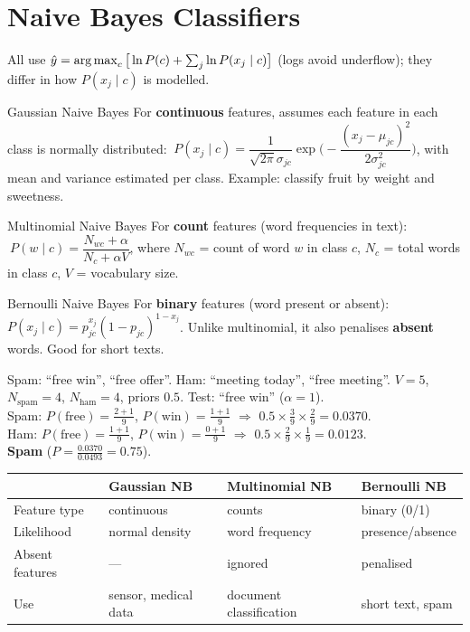 \section{Naive Bayes Classifiers}
All use $\hat y=\operatorname*{arg\,max}_c\big[\ln P(c)+\sum_j\ln P(x_j\mid c)\big]$ (logs avoid underflow); they differ in how $P(x_j\mid c)$ is modelled.

\begin{dfn}{Gaussian Naive Bayes}
For \textbf{continuous} features, assumes each feature in each class is normally distributed:
$\ P(x_j\mid c)=\dfrac1{\sqrt{2\pi}\sigma_{jc}}\exp\!\Big(-\dfrac{(x_j-\mu_{jc})^2}{2\sigma_{jc}^2}\Big)$, with mean and variance estimated per class. Example: classify fruit by weight and sweetness.
\end{dfn}
\begin{dfn}{Multinomial Naive Bayes}
For \textbf{count} features (word frequencies in text): $\ P(w\mid c)=\dfrac{N_{wc}+\alpha}{N_c+\alpha V}$, where $N_{wc}$ = count of word $w$ in class $c$, $N_c$ = total words in class $c$, $V$ = vocabulary size.
\end{dfn}
\begin{dfn}{Bernoulli Naive Bayes}
For \textbf{binary} features (word present or absent): $P(x_j\mid c)=p_{jc}^{x_j}(1-p_{jc})^{1-x_j}$. Unlike multinomial, it also penalises \textbf{absent} words. Good for short texts.
\end{dfn}

\begin{numer}[: Multinomial NB]
Spam: ``free win'', ``free offer''. Ham: ``meeting today'', ``free meeting''. $V=5$, $N_{\text{spam}}=4$, $N_{\text{ham}}=4$, priors $0.5$. Test: ``free win'' ($\alpha=1$).\\
Spam: $P(\text{free})=\frac{2+1}{9}$, $P(\text{win})=\frac{1+1}9$ $\Rightarrow$ $0.5\times\frac39\times\frac29=0.0370$.\\
Ham: $P(\text{free})=\frac{1+1}{9}$, $P(\text{win})=\frac{0+1}9$ $\Rightarrow$ $0.5\times\frac29\times\frac19=0.0123$.\\
\textbf{Spam} ($P=\frac{0.0370}{0.0493}=0.75$).
\end{numer}

\begin{center}
\small
\begin{tabular}{@{}p{2.6cm}p{4.3cm}p{4.3cm}p{4.3cm}@{}}
\toprule
 & \textbf{Gaussian NB} & \textbf{Multinomial NB} & \textbf{Bernoulli NB}\\
\midrule
Feature type & continuous & counts & binary (0/1)\\
Likelihood & normal density & word frequency & presence/absence\\
Absent features & --- & ignored & penalised\\
Use & sensor, medical data & document classification & short text, spam\\
\bottomrule
\end{tabular}
\end{center}

